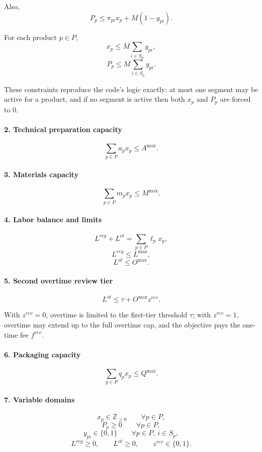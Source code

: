 Also,
\[
P_p \le \pi_{pi} x_p + M(1-y_{pi}).
\]

For each product $p \in P$,
\[
x_p \le M \sum_{i \in S_p} y_{pi},
\]
\[
P_p \le M \sum_{i \in S_p} y_{pi}.
\]

These constraints reproduce the code's logic exactly: at most one segment may be active for a product, and if no segment is active then both $x_p$ and $P_p$ are forced to $0$.

\paragraph{2. Technical preparation capacity}
\[
\sum_{p \in P} a_p x_p \le A^{\max}.
\]

\paragraph{3. Materials capacity}
\[
\sum_{p \in P} m_p x_p \le M^{\max}.
\]

\paragraph{4. Labor balance and limits}
\[
L^{reg} + L^{ot} = \sum_{p \in P} \ell_p x_p,
\]
\[
L^{reg} \le L^{\max},
\]
\[
L^{ot} \le O^{\max}.
\]

\paragraph{5. Second overtime review tier}
\[
L^{ot} \le \tau + O^{\max} z^{rev}.
\]

With $z^{rev}=0$, overtime is limited to the first-tier threshold $\tau$; with $z^{rev}=1$, overtime may extend up to the full overtime cap, and the objective pays the one-time fee $f^{rev}$.

\paragraph{6. Packaging capacity}
\[
\sum_{p \in P} q_p x_p \le Q^{\max}.
\]

\paragraph{7. Variable domains}
\[
x_p \in \mathbb{Z}_{\ge 0} \qquad \forall p \in P,
\]
\[
P_p \ge 0 \qquad \forall p \in P,
\]
\[
y_{pi} \in \{0,1\} \qquad \forall p \in P,\ i \in S_p,
\]
\[
L^{reg} \ge 0,\qquad L^{ot} \ge 0,\qquad z^{rev}\in\{0,1\}.
\]

